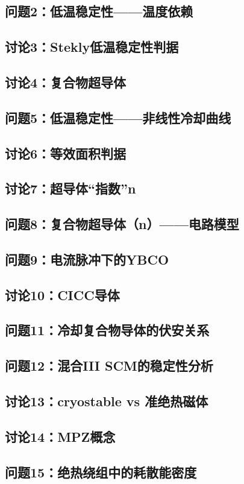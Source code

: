 \newpage
\subsection{问题2：低温稳定性——温度依赖}

\newpage
\subsection{讨论3：Stekly低温稳定性判据}

\newpage
\subsection{讨论4：复合物超导体}

\newpage
\subsection{问题5：低温稳定性——非线性冷却曲线}

\newpage
\subsection{讨论6：等效面积判据}

\newpage
\subsection{讨论7：超导体“指数”n}

\newpage
\subsection{问题8：复合物超导体（n）——电路模型}

\newpage
\subsection{问题9：电流脉冲下的YBCO}

\newpage
\subsection{讨论10：CICC导体}

\newpage
\subsection{问题11：冷却复合物导体的伏安关系}

\newpage
\subsection{问题12：混合III SCM的稳定性分析}

\newpage
\subsection{讨论13：cryostable vs 准绝热磁体}

\newpage
\subsection{讨论14：MPZ概念}

\newpage
\subsection{问题15：绝热绕组中的耗散能密度}